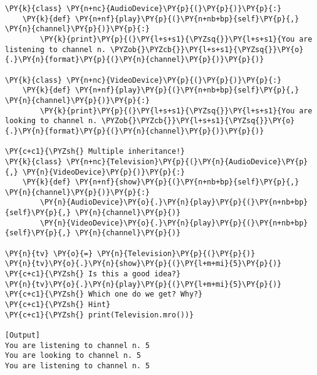 \begin{Verbatim}[label=\makebox{\url{https://github.com/lucabaldini/cmepda/tree/master/slides/latex/snippets/multiple\_inheritance.py}},commandchars=\\\{\}]
\PY{k}{class} \PY{n+nc}{AudioDevice}\PY{p}{(}\PY{p}{)}\PY{p}{:}
    \PY{k}{def} \PY{n+nf}{play}\PY{p}{(}\PY{n+nb+bp}{self}\PY{p}{,} \PY{n}{channel}\PY{p}{)}\PY{p}{:}
        \PY{k}{print}\PY{p}{(}\PY{l+s+s1}{\PYZsq{}}\PY{l+s+s1}{You are listening to channel n. \PYZob{}\PYZcb{}}\PY{l+s+s1}{\PYZsq{}}\PY{o}{.}\PY{n}{format}\PY{p}{(}\PY{n}{channel}\PY{p}{)}\PY{p}{)}

\PY{k}{class} \PY{n+nc}{VideoDevice}\PY{p}{(}\PY{p}{)}\PY{p}{:}
    \PY{k}{def} \PY{n+nf}{play}\PY{p}{(}\PY{n+nb+bp}{self}\PY{p}{,} \PY{n}{channel}\PY{p}{)}\PY{p}{:}
        \PY{k}{print}\PY{p}{(}\PY{l+s+s1}{\PYZsq{}}\PY{l+s+s1}{You are looking to channel n. \PYZob{}\PYZcb{}}\PY{l+s+s1}{\PYZsq{}}\PY{o}{.}\PY{n}{format}\PY{p}{(}\PY{n}{channel}\PY{p}{)}\PY{p}{)}

\PY{c+c1}{\PYZsh{} Multiple inheritance!}
\PY{k}{class} \PY{n+nc}{Television}\PY{p}{(}\PY{n}{AudioDevice}\PY{p}{,} \PY{n}{VideoDevice}\PY{p}{)}\PY{p}{:}
    \PY{k}{def} \PY{n+nf}{show}\PY{p}{(}\PY{n+nb+bp}{self}\PY{p}{,} \PY{n}{channel}\PY{p}{)}\PY{p}{:}
        \PY{n}{AudioDevice}\PY{o}{.}\PY{n}{play}\PY{p}{(}\PY{n+nb+bp}{self}\PY{p}{,} \PY{n}{channel}\PY{p}{)}
        \PY{n}{VideoDevice}\PY{o}{.}\PY{n}{play}\PY{p}{(}\PY{n+nb+bp}{self}\PY{p}{,} \PY{n}{channel}\PY{p}{)}
    
\PY{n}{tv} \PY{o}{=} \PY{n}{Television}\PY{p}{(}\PY{p}{)}
\PY{n}{tv}\PY{o}{.}\PY{n}{show}\PY{p}{(}\PY{l+m+mi}{5}\PY{p}{)}
\PY{c+c1}{\PYZsh{} Is this a good idea?}
\PY{n}{tv}\PY{o}{.}\PY{n}{play}\PY{p}{(}\PY{l+m+mi}{5}\PY{p}{)} \PY{c+c1}{\PYZsh{} Which one do we get? Why?}
\PY{c+c1}{\PYZsh{} Hint}
\PY{c+c1}{\PYZsh{} print(Television.mro())}

[Output]
You are listening to channel n. 5
You are looking to channel n. 5
You are listening to channel n. 5
\end{Verbatim}